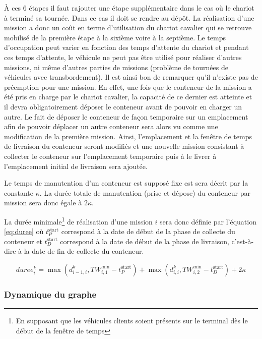 À ces 6 étapes il faut rajouter une étape supplémentaire dans le cas où le chariot à terminé sa tournée. Dans ce cas il doit se rendre au dépôt.
La réalisation d'une mission a donc un coût en terme d'utilisation du chariot cavalier qui se retrouve mobilisé de la première étape à la sixième voire à la septième. Le temps d'occupation peut varier en fonction des temps d'attente du chariot et pendant ces temps d'attente, le véhicule ne peut pas être utilisé pour réaliser d'autres missions, ni même d'autres parties de missions (problème de tournées de véhicules avec transbordement). Il est ainsi bon de remarquer qu'il n'existe pas de préemption pour une mission. En effet, une fois que le conteneur de la mission a été pris en charge par le chariot cavalier, la capacité de ce dernier est atteinte et il devra obligatoirement déposer le conteneur avant de pouvoir en charger un autre. Le fait de déposer le conteneur de façon temporaire sur un emplacement afin de pouvoir déplacer un autre conteneur sera alors vu comme une modification de la première mission. Ainsi, l'emplacement et la fenêtre de temps de livraison du conteneur seront modifiés et une nouvelle 
mission consistant à collecter le conteneur sur l'emplacement temporaire puis à le livrer à l'emplacement initial de livraison sera ajoutée.

Le temps de manutention d'un conteneur est supposé fixe est sera décrit par la constante $\kappa$. La durée totale de manutention (prise et dépose) du conteneur par mission sera donc égale à $2\kappa$.


La durée minimale\footnote{En supposant que les véhicules clients soient présents sur le terminal dès le début de la fenêtre de temps} de réalisation d'une mission $i$ sera donc définie par l'équation \ref{eq:duree} où $t^{\text{start}}_P$ correspond à la date de début de la phase de collecte du conteneur et $t^{\text{start}}_D$ correspond à la date de début de la phase de livraison, c'est-à-dire à la date de fin de collecte du conteneur.

\begin{equation}
\label{eq:duree}
  duree^{k}_{i} = \max \left( d^k_{i-1,i} ,   TW^{\min}_{i,1} - t^{\text{start}}_P\right) + \max \left( d^k_{i,i} , TW^{\min}_{i,2} - t^{\text{start}}_D\right) + 2\kappa
\end{equation}

\subsubsection{Dynamique du graphe}

